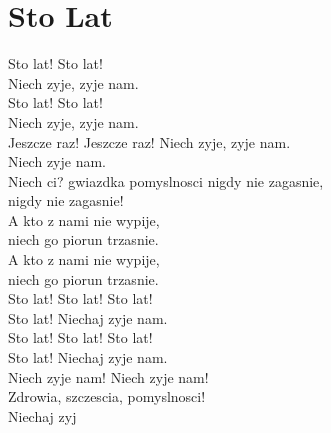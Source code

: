\documentclass[twoside,8pt]{scrartcl}
\begin{document}
\section{Sto Lat}
Sto lat! Sto lat!\\
Niech zyje, zyje nam. \\
Sto lat! Sto lat!\\
Niech zyje, zyje nam. \\
Jeszcze raz! Jeszcze raz! Niech zyje, zyje nam. \\
Niech zyje nam. \\
\newline
Niech ci? gwiazdka pomyslnosci nigdy nie zagasnie, \\
nigdy nie zagasnie!\\ 
A kto z nami nie wypije,\\
niech go piorun trzasnie. \\
A kto z nami nie wypije,\\
niech go piorun trzasnie. \\
\newline
Sto lat! Sto lat! Sto lat!\\
Sto lat! Niechaj zyje nam. \\
Sto lat! Sto lat! Sto lat!\\
Sto lat! Niechaj zyje nam. \\
Niech zyje nam! Niech zyje nam! \\
Zdrowia, szczescia, pomyslnosci! \\
Niechaj zyj\\
\clearpage
\end{document}
